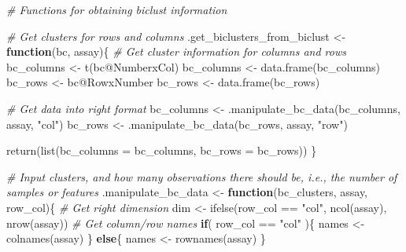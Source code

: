 \documentclass[
]{book}
\newenvironment{Shaded}{\begin{snugshade}}{\end{snugshade}}
\newcommand{\AttributeTok}[1]{\textcolor[rgb]{0.77,0.63,0.00}{#1}}
\newcommand{\CommentTok}[1]{\textcolor[rgb]{0.56,0.35,0.01}{\textit{#1}}}
\newcommand{\ControlFlowTok}[1]{\textcolor[rgb]{0.13,0.29,0.53}{\textbf{#1}}}
\newcommand{\FunctionTok}[1]{\textcolor[rgb]{0.00,0.00,0.00}{#1}}
\newcommand{\NormalTok}[1]{#1}
\newcommand{\OtherTok}[1]{\textcolor[rgb]{0.56,0.35,0.01}{#1}}
\newcommand{\SpecialCharTok}[1]{\textcolor[rgb]{0.00,0.00,0.00}{#1}}
\newcommand{\StringTok}[1]{\textcolor[rgb]{0.31,0.60,0.02}{#1}}
\begin{document}
\begin{Shaded}
\begin{Highlighting}[]
\CommentTok{\# Functions for obtaining biclust information}

\CommentTok{\# Get clusters for rows and columns}
\NormalTok{.get\_biclusters\_from\_biclust }\OtherTok{\textless{}{-}} \ControlFlowTok{function}\NormalTok{(bc, assay)\{}
  \CommentTok{\# Get cluster information for columns and rows}
\NormalTok{  bc\_columns }\OtherTok{\textless{}{-}} \FunctionTok{t}\NormalTok{(bc}\SpecialCharTok{@}\NormalTok{NumberxCol)}
\NormalTok{  bc\_columns }\OtherTok{\textless{}{-}} \FunctionTok{data.frame}\NormalTok{(bc\_columns)}
\NormalTok{  bc\_rows }\OtherTok{\textless{}{-}}\NormalTok{ bc}\SpecialCharTok{@}\NormalTok{RowxNumber}
\NormalTok{  bc\_rows }\OtherTok{\textless{}{-}} \FunctionTok{data.frame}\NormalTok{(bc\_rows)}
  
  \CommentTok{\# Get data into right format}
\NormalTok{  bc\_columns }\OtherTok{\textless{}{-}} \FunctionTok{.manipulate\_bc\_data}\NormalTok{(bc\_columns, assay, }\StringTok{"col"}\NormalTok{)}
\NormalTok{  bc\_rows }\OtherTok{\textless{}{-}} \FunctionTok{.manipulate\_bc\_data}\NormalTok{(bc\_rows, assay, }\StringTok{"row"}\NormalTok{)}
  
  \FunctionTok{return}\NormalTok{(}\FunctionTok{list}\NormalTok{(}\AttributeTok{bc\_columns =}\NormalTok{ bc\_columns, }\AttributeTok{bc\_rows =}\NormalTok{ bc\_rows))}
\NormalTok{\}}

\CommentTok{\# Input clusters, and how many observations there should be, i.e., the number of samples or features}
\NormalTok{.manipulate\_bc\_data }\OtherTok{\textless{}{-}} \ControlFlowTok{function}\NormalTok{(bc\_clusters, assay, row\_col)\{}
  \CommentTok{\# Get right dimension}
\NormalTok{  dim }\OtherTok{\textless{}{-}} \FunctionTok{ifelse}\NormalTok{(row\_col }\SpecialCharTok{==} \StringTok{"col"}\NormalTok{, }\FunctionTok{ncol}\NormalTok{(assay), }\FunctionTok{nrow}\NormalTok{(assay))}
  \CommentTok{\# Get column/row names}
  \ControlFlowTok{if}\NormalTok{( row\_col }\SpecialCharTok{==} \StringTok{"col"}\NormalTok{ )\{}
\NormalTok{    names }\OtherTok{\textless{}{-}} \FunctionTok{colnames}\NormalTok{(assay)}
\NormalTok{  \} }\ControlFlowTok{else}\NormalTok{\{}
\NormalTok{    names }\OtherTok{\textless{}{-}} \FunctionTok{rownames}\NormalTok{(assay)}
\NormalTok{  \}}
  

\end{Highlighting}
\end{Shaded}
\end{document}
